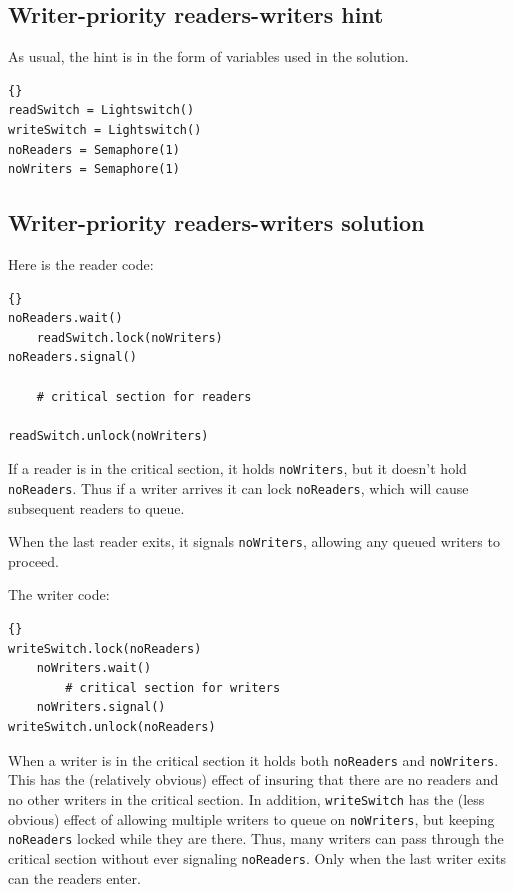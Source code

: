 \documentclass{book}
\newcommand{\clearemptydoublepage}{\newpage\cleardoublepage}
\begin{document}
\clearemptydoublepage
\subsection{Writer-priority readers-writers hint}

As usual, the hint is in the form of variables
used in the solution.

\begin{lstlisting}[caption={Writer-priority readers-writers initialization}]{}
readSwitch = Lightswitch()
writeSwitch = Lightswitch()
noReaders = Semaphore(1)
noWriters = Semaphore(1)
\end{lstlisting}


\clearemptydoublepage
\subsection{Writer-priority readers-writers solution}

Here is the reader code:

\begin{lstlisting}[caption={Writer-priority reader solution}]{}
noReaders.wait()
    readSwitch.lock(noWriters)
noReaders.signal()

    # critical section for readers

readSwitch.unlock(noWriters)
\end{lstlisting}

If a reader is in the critical section, it holds
{\tt noWriters}, but it doesn't hold {\tt noReaders}.
Thus if a writer arrives it can lock {\tt noReaders},
which will cause subsequent readers to queue.

When the last reader exits, it signals {\tt noWriters},
allowing any queued writers to proceed.

The writer code:

\begin{lstlisting}[caption={Writer-priority writer solution}]{}
writeSwitch.lock(noReaders)
    noWriters.wait()
        # critical section for writers
    noWriters.signal()
writeSwitch.unlock(noReaders)
\end{lstlisting}

When a writer is in the critical section it holds both
{\tt noReaders} and {\tt noWriters}.  This has the
(relatively obvious) effect of insuring that there are
no readers and no other writers in the critical section.
In addition, {\tt writeSwitch} has the (less obvious) effect of
allowing multiple writers to queue on {\tt noWriters},
but keeping {\tt noReaders} locked while they are
there.  Thus, many writers can pass through the critical
section without ever signaling
{\tt noReaders}.  Only when the last writer exits can
the readers enter.
\end{document}
